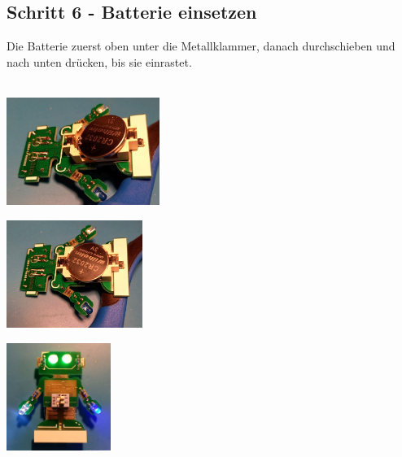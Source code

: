 \documentclass[a4paper]{article}
\begin{document}
\subsection{Schritt 6 - Batterie einsetzen}
Die Batterie zuerst oben unter die Metallklammer, danach durchschieben und nach unten drücken, bis sie einrastet.\\
\ \\
\begin{minipage}[t]{0.33\textwidth}
  \centering
  \includegraphics[height=3.5cm]{../pictures/Bat4.jpg}
  \label{img:Bat4}
  \end{minipage}
\begin{minipage}[t]{0.33\textwidth}
  \centering
  \includegraphics[height=3.5cm]{../pictures/Bat5.jpg}
  \label{img:Bat5}
\end{minipage}
\begin{minipage}[t]{0.33\textwidth}
  \centering
  \includegraphics[height=3.5cm]{../pictures/Ready.jpg}
  \label{img:Ready}
\end{minipage}
\end{document}
